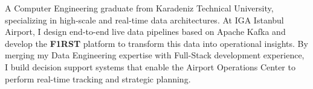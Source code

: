 
\begin{cvparagraph}
A Computer Engineering graduate from Karadeniz Technical University, specializing in high-scale and real-time data architectures. At IGA Istanbul Airport, I design end-to-end live data pipelines based on Apache Kafka and develop the \textbf{F1RST} platform to transform this data into operational insights. By merging my Data Engineering expertise with Full-Stack development experience, I build decision support systems that enable the Airport Operations Center to perform real-time tracking and strategic planning.
\end{cvparagraph}